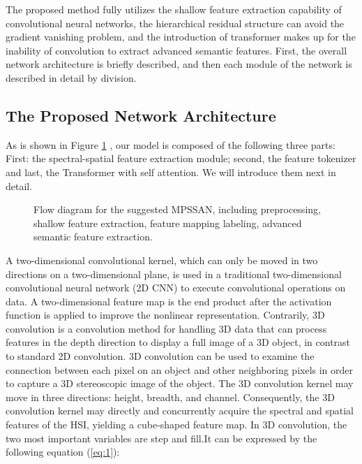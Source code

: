 \documentclass[]{interact}
\theoremstyle{plain}%
\theoremstyle{definition}
\theoremstyle{remark}
\begin{document}
The proposed method fully utilizes the shallow feature extraction capability of convolutional neural networks, the hierarchical residual structure can avoid the gradient vanishing problem, and the introduction of transformer makes up for the inability of convolution to extract advanced semantic features. First, the overall network architecture is briefly described, and then each module of the network is described in detail by division.

\subsection{The Proposed Network Architecture}

As is shown in Figure \ref{fig:1} , our model is composed of the following three parts: First: the spectral-spatial feature extraction module; second, the feature tokenizer and last, the Transformer with self attention. We will introduce them next in detail.

\begin{figure}[H]
\centering
{}
\caption{Flow diagram for the suggested MPSSAN, including preprocessing, shallow feature extraction, feature mapping labeling, advanced semantic feature extraction.}\label{fig:1}
\end{figure}
A two-dimensional convolutional kernel, which can only be moved in two directions on a two-dimensional plane, is used in a traditional two-dimensional convolutional neural network (2D CNN) to execute convolutional operations on data. A two-dimensional feature map is the end product after the activation function is applied to improve the nonlinear representation. Contrarily, 3D convolution is a convolution method for handling 3D data that can process features in the depth direction to display a full image of a 3D object, in contrast to standard 2D convolution. 3D convolution can be used to examine the connection between each pixel on an object and other neighboring pixels in order to capture a 3D stereoscopic image of the object. The 3D convolution kernel may move in three directions: height, breadth, and channel. Consequently, the 3D convolution kernel may directly and concurrently acquire the spectral and spatial features of the HSI, yielding a cube-shaped feature map. In 3D convolution, the two most important variables are step and fill.It can be expressed by the following equation (\ref{eq:1}):
\end{document}
